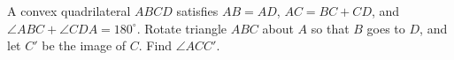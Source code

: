 A convex quadrilateral $ABCD$ satisfies $AB=AD$, $AC=BC+CD$, and $\angle ABC+\angle CDA=180^\circ$. Rotate triangle $ABC$ about $A$ so that $B$ goes to $D$, and let $C'$ be the image of $C$. Find $\angle ACC'$.
